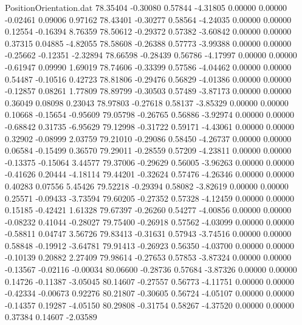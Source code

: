 \begin{filecontents}{PositionOrientation.dat}
  78.35404   -0.30080    0.57844    -4.31805    0.00000    0.00000   -0.02461    0.09006    0.97162
  78.43401   -0.30277    0.58564    -4.24035    0.00000    0.00000    0.12554   -0.16394    8.76359
  78.50612   -0.29372    0.57382    -3.60842    0.00000    0.00000    0.37315    0.04885   -4.82055
  78.58608   -0.26388    0.57773    -3.99388    0.00000    0.00000   -0.25662   -0.12351   -2.32894
  78.66598   -0.28439    0.56786    -4.17997    0.00000    0.00000   -0.61947    0.09990    1.69019
  78.74606   -0.33399    0.57586    -4.04462    0.00000    0.00000    0.54487   -0.10516    0.42723
  78.81806   -0.29476    0.56829    -4.01386    0.00000    0.00000   -0.12857    0.08261    1.77809
  78.89799   -0.30503    0.57489    -3.87173    0.00000    0.00000    0.36049    0.08098    0.23043
  78.97803   -0.27618    0.58137    -3.85329    0.00000    0.00000    0.10668   -0.15654   -0.95609
  79.05798   -0.26765    0.56886    -3.92974    0.00000    0.00000   -0.68842    0.31735   -6.95629
  79.12998   -0.31722    0.59171    -4.43061    0.00000    0.00000    0.32902   -0.08999    2.03759
  79.21010   -0.29086    0.58450    -4.26737    0.00000    0.00000    0.06584   -0.15499    0.36570
  79.29011   -0.28559    0.57209    -4.23811    0.00000    0.00000   -0.13375   -0.15064    3.44577
  79.37006   -0.29629    0.56005    -3.96263    0.00000    0.00000   -0.41626    0.20444   -4.18114
  79.44201   -0.32624    0.57476    -4.26346    0.00000    0.00000    0.40283    0.07556    5.45426
  79.52218   -0.29394    0.58082    -3.82619    0.00000    0.00000    0.25571   -0.09433   -3.73594
  79.60205   -0.27352    0.57328    -4.12459    0.00000    0.00000    0.15185   -0.42421    1.61328
  79.67397   -0.26260    0.54277    -4.00856    0.00000    0.00000   -0.08232    0.41044   -0.28027
  79.75400   -0.26918    0.57562    -4.03099    0.00000    0.00000   -0.58811    0.04747    3.56726
  79.83413   -0.31631    0.57943    -3.74516    0.00000    0.00000    0.58848   -0.19912   -3.64781
  79.91413   -0.26923    0.56350    -4.03700    0.00000    0.00000   -0.10139    0.20882    2.27409
  79.98614   -0.27653    0.57853    -3.87324    0.00000    0.00000   -0.13567   -0.02116   -0.00034
  80.06600   -0.28736    0.57684    -3.87326    0.00000    0.00000    0.14726   -0.11387   -3.05045
  80.14607   -0.27557    0.56773    -4.11751    0.00000    0.00000   -0.42334   -0.00673    0.92276
  80.21807   -0.30605    0.56724    -4.05107    0.00000    0.00000   -0.14357    0.19287   -4.05150
  80.29808   -0.31754    0.58267    -4.37520    0.00000    0.00000    0.37384    0.14607   -2.03589

\end{filecontents}
